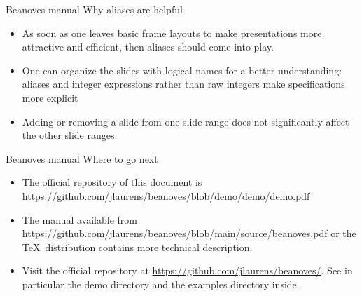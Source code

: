 \documentclass{beamer}
\begin{document}
\begin{frame}
{Beanoves manual}
{\large Why aliases are helpful}
\begin{itemize}
\item
As soon as one leaves basic frame layouts to make presentations more attractive and efficient, then  aliases should come into play.
\item
One can organize the slides with logical names for a better understanding: aliases and integer expressions rather than raw integers make specifications more explicit
\item
Adding or removing a slide from one slide range does not significantly affect the other slide ranges.
\end{itemize}
\end{frame}
\begin{frame}
{Beanoves manual}
{\large Where to go next}
\begin{itemize}
\item
The official repository of this document is \url{https://github.com/jlaurens/beanoves/blob/demo/demo/demo.pdf}
\item
The  manual available from \url{https://github.com/jlaurens/beanoves/blob/main/source/beanoves.pdf} or the \TeX\ distribution contains more technical description.
\item
Visit the official repository at \url{https://github.com/jlaurens/beanoves/}. See in particular the demo directory and the examples directory inside.
\end{itemize}
\end{frame}
\end{document}
